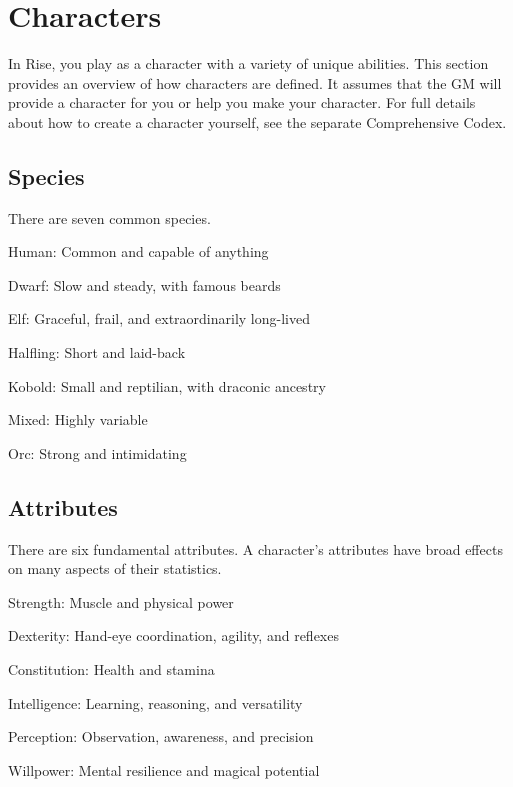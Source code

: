 \chapter{Characters}\label{Characters}

In Rise, you play as a character with a variety of unique abilities.
This section provides an overview of how characters are defined.
It assumes that the GM will provide a character for you or help you make your character.
For full details about how to create a character yourself, see the separate Comprehensive Codex.

\section{Species}
  There are seven common species.
  \begin{raggeditemize}
    \item Human: Common and capable of anything
    \item Dwarf: Slow and steady, with famous beards
    \item Elf: Graceful, frail, and extraordinarily long-lived
    \item Halfling: Short and laid-back
    \item Kobold: Small and reptilian, with draconic ancestry
    \item Mixed: Highly variable
    \item Orc: Strong and intimidating
  \end{raggeditemize}

\section{Attributes}
  There are six fundamental attributes.
  A character's attributes have broad effects on many aspects of their statistics.
  \begin{raggeditemize}
    \item Strength: Muscle and physical power
    \item Dexterity: Hand-eye coordination, agility, and reflexes
    \item Constitution: Health and stamina
    \item Intelligence: Learning, reasoning, and versatility
    \item Perception: Observation, awareness, and precision
    \item Willpower: Mental resilience and magical potential
  \end{raggeditemize}

